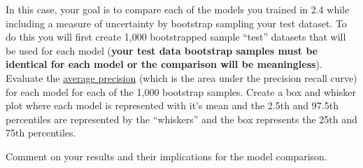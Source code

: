 \documentclass[
  letterpaper,
  DIV=11,
  numbers=noendperiod]{scrartcl}
\begin{document}
In this case, your goal is to compare each of the models you trained in
2.4 while including a measure of uncertainty by bootstrap sampling your
test dataset. To do this you will first create 1,000 bootstrapped sample
``test'' datasets that will be used for each model (\textbf{your test
data bootstrap samples must be identical for each model or the
comparison will be meaningless}). Evaluate the
\href{https://scikit-learn.org/stable/modules/generated/sklearn.metrics.average_precision_score.html}{average
precision} (which is the area under the precision recall curve) for each
model for each of the 1,000 bootstrap samples. Create a box and whisker
plot where each model is represented with it's mean and the 2.5th and
97.5th percentiles are represented by the ``whiskers'' and the box
represents the 25th and 75th percentiles.

Comment on your results and their implications for the model comparison.
\end{document}
